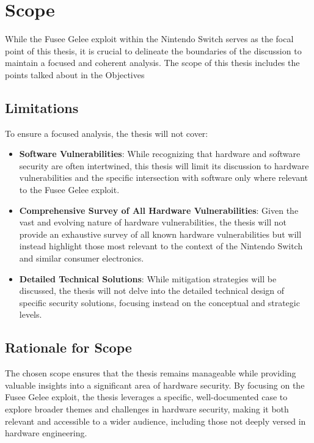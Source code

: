 \hypertarget{scope}{%
\section{Scope}\label{scope}}

While the Fusee Gelee exploit within the Nintendo Switch serves as the
focal point of this thesis, it is crucial to delineate the boundaries of
the discussion to maintain a focused and coherent analysis. The scope of
this thesis includes the points talked about in the Objectives

\hypertarget{limitations}{%
\subsection{Limitations}\label{limitations}}

To ensure a focused analysis, the thesis will not cover:

\begin{itemize}
\item
  \textbf{Software Vulnerabilities}: While recognizing that hardware and
  software security are often intertwined, this thesis will limit its
  discussion to hardware vulnerabilities and the specific intersection
  with software only where relevant to the Fusee Gelee exploit.
\item
  \textbf{Comprehensive Survey of All Hardware Vulnerabilities}: Given
  the vast and evolving nature of hardware vulnerabilities, the thesis
  will not provide an exhaustive survey of all known hardware
  vulnerabilities but will instead highlight those most relevant to the
  context of the Nintendo Switch and similar consumer electronics.
\item
  \textbf{Detailed Technical Solutions}: While mitigation strategies
  will be discussed, the thesis will not delve into the detailed
  technical design of specific security solutions, focusing instead on
  the conceptual and strategic levels.
\end{itemize}

\hypertarget{rationale-for-scope}{%
\subsection{Rationale for Scope}\label{rationale-for-scope}}

The chosen scope ensures that the thesis remains manageable while
providing valuable insights into a significant area of hardware
security. By focusing on the Fusee Gelee exploit, the thesis leverages a
specific, well-documented case to explore broader themes and challenges
in hardware security, making it both relevant and accessible to a wider
audience, including those not deeply versed in hardware engineering.

